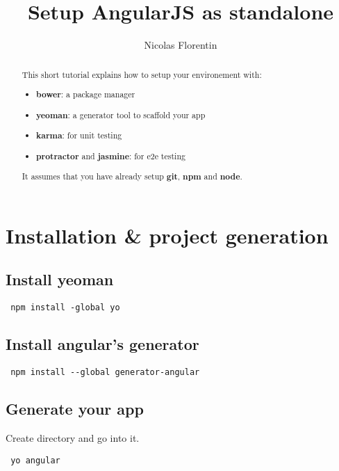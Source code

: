 \documentclass{report}
\title{Setup AngularJS as standalone}
\author{Nicolas Florentin}
\begin{document}
\maketitle

\begin{abstract}
This short tutorial explains how to setup your environement with:
  \begin{itemize}
   \item \textbf{bower}: a package manager
   \item \textbf{yeoman}: a generator tool to scaffold your app
   \item \textbf{karma}: for unit testing
   \item \textbf{protractor} and \textbf{jasmine}: for e2e testing
  \end{itemize} 

It assumes that you have already setup \textbf{git}, \textbf{npm} and \textbf{node}.
\end{abstract}

\section*{Installation \& project generation}

\subsection*{Install yeoman}

\begin{verbatim}
 npm install -global yo
\end{verbatim}

\subsection*{Install angular's generator}

\begin{verbatim}
 npm install --global generator-angular
\end{verbatim}

\subsection*{Generate your app}

Create directory and go into it.

\begin{verbatim}
 yo angular
\end{verbatim}
\end{document}
